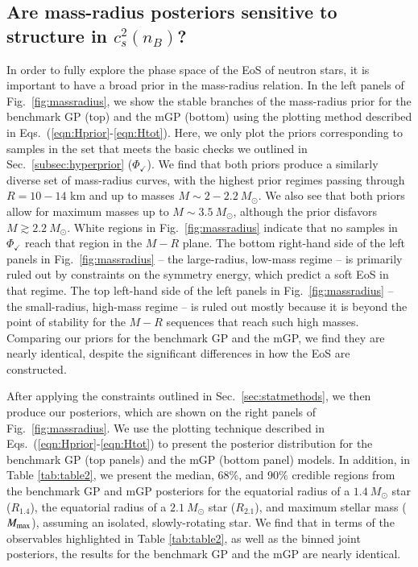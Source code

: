 \documentclass[aps,prd,nofootinbib,tightenlines,notitlepage,floatfix,superscriptaddress,showkeys,twocolumn]{revtex4-1}
\begin{document}

\subsection{Are mass-radius posteriors sensitive to structure in $c_s^2(n_B)$?}

In order to fully explore the phase space of the EoS of neutron stars, it is important to have a broad prior in the mass-radius relation.  In the left panels of Fig.\ \ref{fig:massradius}, we show the stable branches of the mass-radius prior for the benchmark GP (top) and the mGP (bottom) using the plotting method described in Eqs.\ (\ref{eqn:Hprior}-\ref{eqn:Htot}). Here, we only plot the priors corresponding to samples in the set that meets the basic checks we outlined in Sec.~\ref{subsec:hyperprior} ($\Phi_{\checkmark}$). We find that both priors produce a similarly diverse set of mass-radius curves, with the highest prior regimes passing through $R=10-14$ km and up to masses $M\sim 2-2.2 \ M_\odot$. We also see that both priors allow for maximum masses up to $M\sim 3.5 \ M_\odot$, although the prior disfavors $M\gtrsim 2.2 \ M_\odot$. White regions in Fig.\ \ref{fig:massradius} indicate that no samples in $\Phi_{\checkmark}$ reach that region in the $M-R$ plane. The bottom right-hand side of the left panels in Fig.\ \ref{fig:massradius} -- the large-radius, low-mass regime -- is primarily ruled out by constraints on the symmetry energy, which predict a soft EoS in that regime. The top left-hand side of the left panels in Fig.\ \ref{fig:massradius} -- the small-radius, high-mass regime -- is ruled out mostly because it is beyond the point of stability for the $M-R$ sequences that reach such high masses. Comparing our priors for the benchmark GP and the mGP, we find they are nearly identical, despite the significant differences in how the EoS are constructed.

After applying the constraints outlined in Sec.~\ref{sec:statmethods}, we then produce our posteriors, which are shown on the right panels of Fig.\ \ref{fig:massradius}. We use the plotting technique described in Eqs.\ (\ref{eqn:Hprior}-\ref{eqn:Htot}) to present the posterior distribution for the benchmark GP (top panels) and the mGP (bottom panel) models. In addition, in Table \ref{tab:table2}, we present the median, 68\%, and 90\% credible regions from the benchmark GP and mGP posteriors for the equatorial radius of a $1.4 \ M_\odot$ star ($R_{1.4}$), the equatorial radius of a $2.1 \ M_\odot$ star ($R_{2.1}$), and maximum stellar mass ($M_{\rm max}$), assuming an isolated, slowly-rotating star. We find that in terms of the observables highlighted in Table \ref{tab:table2}, as well as the binned joint posteriors, the results for the benchmark GP and the mGP are nearly identical. 
\end{document}
